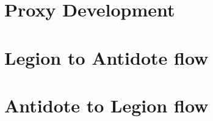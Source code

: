 \section{Proxy Development}
\label{sec:proxy_development}


\section{Legion to Antidote flow}
\label{sec:legion_to_antidote_flow}

\section{Antidote to Legion flow}
\label{sec:antidote to legion flow}